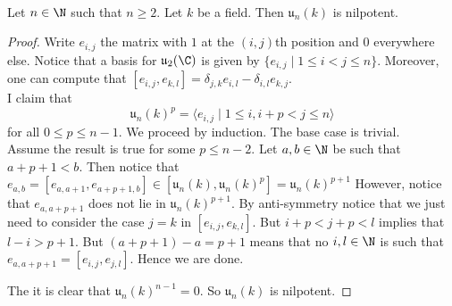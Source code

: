 \documentclass[a4paper]{article}
\begin{document}
\begin{eg}{}{} \\Let $n\in\N$ such that $n\geq 2$. Let $k$ be a field. Then $\mathfrak{u}_n(k)$ is nilpotent. 
\begin{proof}
Write $e_{i,j}$ the matrix with $1$ at the $(i,j)$th position and $0$ everywhere else. Notice that a basis for $\mathfrak{u}_2(\C)$ is given by $\{e_{i,j}\;|\;1\leq i< j\leq n\}$. Moreover, one can compute that $[e_{i,j},e_{k,l}]=\delta_{j,k}e_{i,l}-\delta_{i,l}e_{k,j}$. \\

I claim that $$\mathfrak{u}_n(k)^p=\langle e_{i,j}\;|\;1\leq i, i+p<j\leq n\rangle$$ for all $0\leq p\leq n-1$. We proceed by induction. The base case is trivial. \\

Assume the result is true for some $p\leq n-2$. Let $a,b\in\N$ be such that $a+p+1<b$. Then notice that $e_{a,b}=[e_{a,a+1},e_{a+p+1,b}]\in[\mathfrak{u}_n(k),\mathfrak{u}_n(k)^p]=\mathfrak{u}_n(k)^{p+1}$ However, notice that $e_{a,a+p+1}$ does not lie in $\mathfrak{u}_n(k)^{p+1}$. By anti-symmetry notice that we just need to consider the case $j=k$ in $[e_{i,j},e_{k,l}]$. But $i+p<j+p<l$ implies that $l-i>p+1$. But $(a+p+1)-a=p+1$ means that no $i,l\in\N$ is such that $e_{a,a+p+1}=[e_{i,j},e_{j,l}]$. Hence we are done. 

The it is clear that $\mathfrak{u}_n(k)^{n-1}=0$. So $\mathfrak{u}_n(k)$ is nilpotent. 
\end{proof}
\end{eg}
\end{document}
